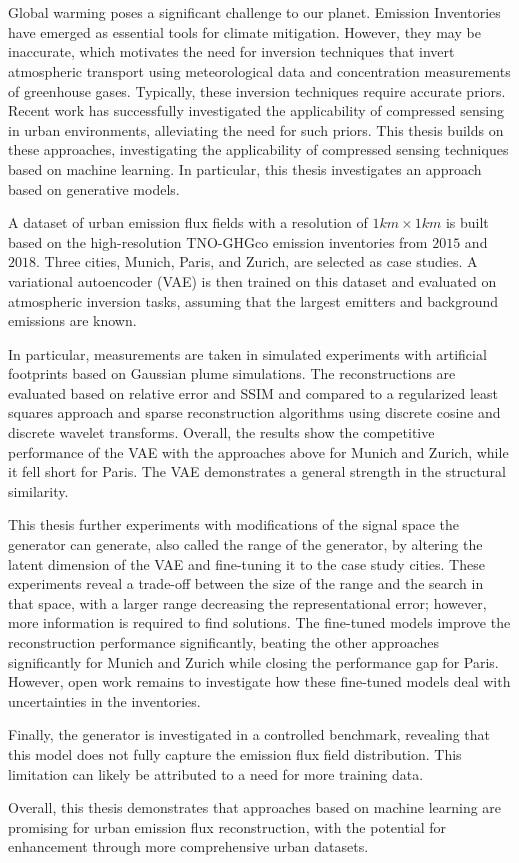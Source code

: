 \chapter{\abstractname}

Global warming poses a significant challenge to our planet.
Emission Inventories have emerged as essential tools for climate mitigation.
However, they may be inaccurate, which motivates the need for inversion techniques that invert atmospheric transport using meteorological data and concentration measurements of greenhouse gases.
Typically, these inversion techniques require accurate priors.
Recent work has successfully investigated the applicability of compressed sensing in urban environments, alleviating the need for such priors.
This thesis builds on these approaches, investigating the applicability of compressed sensing techniques based on machine learning.
In particular, this thesis investigates an approach based on generative models.

A dataset of urban emission flux fields with a resolution of $1 \unit{km} \times 1 \unit{km}$ is built based on the high-resolution TNO-GHGco emission inventories from $2015$ and $2018$.
Three cities, Munich, Paris, and Zurich, are selected as case studies.
A variational autoencoder (VAE) is then trained on this dataset and evaluated on atmospheric inversion tasks, assuming that the largest emitters and background emissions are known. 

In particular, measurements are taken in simulated experiments with artificial footprints based on Gaussian plume simulations.
The reconstructions are evaluated based on relative error and SSIM and compared to a regularized least squares approach and sparse reconstruction algorithms using discrete cosine and discrete wavelet transforms.
Overall, the results show the competitive performance of the VAE with the approaches above for Munich and Zurich, while it fell short for Paris.
The VAE demonstrates a general strength in the structural similarity.

This thesis further experiments with modifications of the signal space the generator can generate, also called the range of the generator, by altering the latent dimension of the VAE and fine-tuning it to the case study cities.
These experiments reveal a trade-off between the size of the range and the search in that space, with a larger range decreasing the representational error; however, more information is required to find solutions.
The fine-tuned models improve the reconstruction performance significantly, beating the other approaches significantly for Munich and Zurich while closing the performance gap for Paris.
However, open work remains to investigate how these fine-tuned models deal with uncertainties in the inventories.

Finally, the generator is investigated in a controlled benchmark, revealing that this model does not fully capture the emission flux field distribution.
This limitation can likely be attributed to a need for more training data.

Overall, this thesis demonstrates that approaches based on machine learning are promising for urban emission flux reconstruction, with the potential for enhancement through more comprehensive urban datasets.
